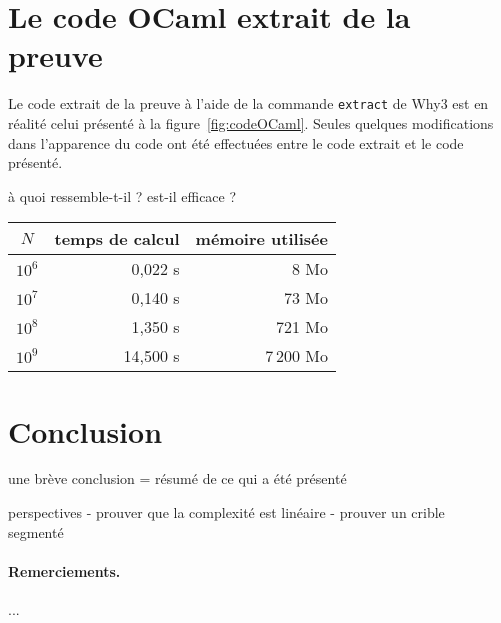 \documentclass[a4paper]{easychair}
\begin{document}


\section{Le code OCaml extrait de la preuve}
\label{sec:extraction}

Le code extrait de la preuve à l'aide de la commande \texttt{extract} de Why3
est en réalité celui présenté à la figure~\ref{fig:codeOCaml}.
Seules quelques modifications dans l'apparence du code ont été effectuées
entre le code extrait et le code présenté.

à quoi ressemble-t-il ?
est-il efficace ?

\begin{center}
  \begin{tabular}{|c|r|r|}
    \hline
    $N$ & temps de calcul & mémoire utilisée \\
    \hline\hline
    $10^6$ &  0,022 s &      8 Mo \\\hline
    $10^7$ &  0,140 s &     73 Mo \\\hline
    $10^8$ &  1,350 s &    721 Mo \\\hline
    $10^9$ & 14,500 s & 7\,200 Mo \\\hline
  \end{tabular}
\end{center}

\section{Conclusion}
\label{sec:conclusion}

une brève conclusion = résumé de ce qui a été présenté

perspectives
- prouver que la complexité est linéaire
- prouver un crible segmenté~\cite{crible-segmente}


\paragraph{Remerciements.} ...



\end{document}
